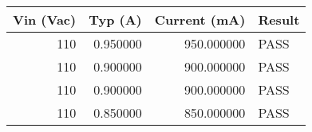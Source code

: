 \begin{center}
    \begin{tabular}{rrrl}
        \toprule
        Vin (Vac) & Typ (A) & Current (mA) & Result \\
        \midrule
        110 & 0.950000 & 950.000000 & PASS \\
        110 & 0.900000 & 900.000000 & PASS \\
        110 & 0.900000 & 900.000000 & PASS \\
        110 & 0.850000 & 850.000000 & PASS \\
        \bottomrule
    \end{tabular}
\end{center}
